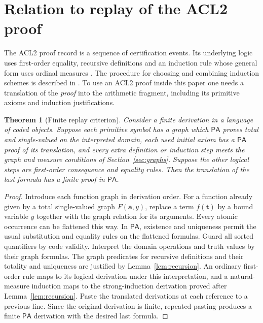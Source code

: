 \documentclass[11pt]{amsart}
\newtheorem{theorem}{Theorem}[section]
\theoremstyle{definition}
\theoremstyle{remark}
\numberwithin{equation}{section}
\newcommand{\PA}{\mathsf{PA}}
\begin{document}
\section{Relation to replay of the ACL2 proof}
\label{sec:transfer}

The ACL2 proof record is a sequence of certification events.
Its underlying logic uses first-order equality, recursive definitions
and an induction rule whose general form uses ordinal measures
\cite[Sections 10--13]{acl2logic}. The procedure for choosing and
combining induction schemes is described in \cite{acl2induction}.
To use an ACL2 proof inside this paper one needs a translation of the
\emph{proof} into the arithmetic fragment, including its primitive
axioms and induction justifications.

\begin{theorem}[Finite replay criterion]\label{thm:replay}
Consider a finite derivation in a language of coded objects. Suppose
each primitive symbol has a graph which $\PA$ proves total and
single-valued on the interpreted domain, each used initial axiom
has a $\PA$ proof of its translation, and every extra definition
or induction step meets the graph and measure conditions of
Section~\ref{sec:graphs}. Suppose the other logical steps are
first-order consequence and equality rules. Then the translation
of the last formula has a finite proof in $\PA$.
\end{theorem}
\begin{proof}
Introduce each function graph in derivation order. For a function
already given by a total single-valued graph $F(\mathbf a,y)$,
replace a term $f(\mathbf t)$ by a bound variable $y$ together
with the graph relation for its arguments. Every atomic occurrence
can be flattened this way. In $\PA$, existence and uniqueness
permit the usual substitution and equality rules on the flattened
formulas. Guard all sorted quantifiers by code validity. Interpret
the domain operations and truth values by their graph formulas.
The graph predicates for recursive definitions and their totality
and uniqueness are justified by Lemma~\ref{lem:recursion}.
An ordinary first-order rule maps to its logical derivation under
this interpretation, and a natural-measure induction maps to the
strong-induction derivation proved after Lemma~\ref{lem:recursion}.
Paste the translated derivations at each reference to a previous
line. Since the original derivation is finite, repeated pasting
produces a finite $\PA$ derivation with the desired last formula.
\end{proof}
\end{document}
